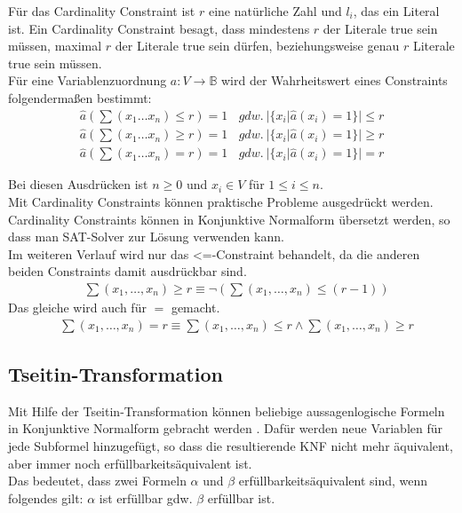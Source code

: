 \documentclass[a4,abstract=on]{scrartcl}
\begin{document}
Für das Cardinality Constraint ist $r$ eine natürliche Zahl und $l_i$, das ein Literal ist. Ein Cardinality Constraint besagt, dass mindestens $r$ der Literale true sein müssen, maximal $r$ der Literale true sein dürfen, beziehungsweise genau $r$ Literale true sein müssen.\\
Für eine Variablenzuordnung $a:V \rightarrow \mathbb{B}$ wird der Wahrheitswert eines Constraints folgendermaßen bestimmt:
\begin{align*}
\hat{a} (\sum(x_1 \dots x_n ) \leq r) = 1 {~~~~} gdw. {~} |\{x_i|\hat{a} (x_i) = 1\}| \leq r \\
\hat{a} (\sum(x_1 \dots x_n ) \geq r) = 1 {~~~~} gdw. {~} |\{x_i|\hat{a} (x_i) = 1\}| \geq r \\
\hat{a} (\sum(x_1 \dots x_n ) = r) = 1 {~~~~} gdw. {~} |\{x_i|\hat{a} (x_i) = 1\}| = r 
\end{align*}

Bei diesen Ausdrücken ist $n\geq 0$ und $x_i \in V$ für $1 \leq i \leq n$.\\
Mit Cardinality Constraints können praktische Probleme ausgedrückt werden. Cardinality Constraints können in Konjunktive Normalform übersetzt werden, so dass man SAT-Solver zur Lösung verwenden kann.\\
Im weiteren Verlauf wird nur das <=-Constraint behandelt, da die anderen beiden Constraints damit ausdrückbar sind.
\begin{align*}
&\sum (x_1, \dots, x_n) \geq r \equiv \neg (\sum (x_1, \dots, x_n) \leq (r-1))
\end{align*}
Das gleiche wird auch für $=$ gemacht.
\begin{align*}
&\sum(x_1, \dots, x_n) = r \equiv \sum(x_1, \dots, x_n) \leq r \wedge \sum(x_1, \dots, x_n) \geq r
\end{align*}


\subsection{Tseitin-Transformation}
Mit Hilfe der Tseitin-Transformation können beliebige aussagenlogische Formeln in Konjunktive Normalform gebracht werden \cite [vgl.][]{tseitin}. Dafür werden neue Variablen für jede Subformel hinzugefügt, so dass die resultierende KNF nicht mehr äquivalent, aber immer noch erfüllbarkeitsäquivalent ist. \\
Das bedeutet, dass zwei Formeln $\alpha$ und $\beta$ erfüllbarkeitsäquivalent sind, wenn folgendes gilt:
$\alpha$ ist erfüllbar gdw. $\beta$ erfüllbar ist.
\end{document}
